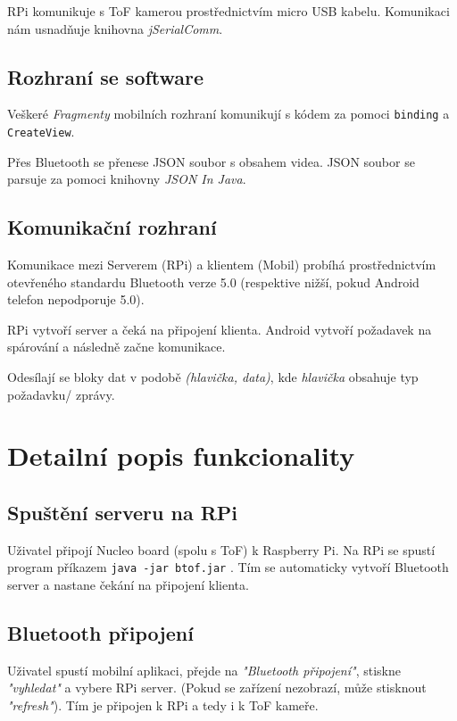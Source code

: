 \documentclass[12pt,a4paper]{article}
\begin{document}
RPi komunikuje s ToF kamerou prostřednictvím micro USB kabelu. Komunikaci nám usnadňuje knihovna \textit{jSerialComm}.

\subsection{Rozhraní se software}

Veškeré \textit{Fragmenty} mobilních rozhraní komunikují s kódem za pomoci \texttt{binding} a \texttt{CreateView}.

Přes Bluetooth se přenese JSON soubor s obsahem videa. JSON soubor se parsuje za pomoci knihovny \textit{JSON In Java}.


\subsection{Komunikační rozhraní}

Komunikace mezi Serverem (RPi) a klientem (Mobil) probíhá prostřednictvím otevřeného standardu Bluetooth verze 5.0 (respektive nižší, pokud Android telefon nepodporuje 5.0).

RPi vytvoří server a čeká na připojení klienta. Android vytvoří požadavek na spárování a následně začne komunikace.

Odesílají se bloky dat v podobě \textit{(hlavička, data)}, kde \textit{hlavička} obsahuje typ požadavku/ zprávy.

\section{Detailní popis funkcionality}

\subsection{Spuštění serveru na RPi}
Uživatel připojí Nucleo board (spolu s ToF) k Raspberry Pi.
Na RPi se spustí program příkazem \texttt{java -jar btof.jar} .
Tím se automaticky vytvoří Bluetooth server a nastane čekání na připojení klienta.

\subsection{Bluetooth připojení}
Uživatel spustí mobilní aplikaci, přejde na \textit{"Bluetooth připojení"}, stiskne \textit{"vyhledat"} a vybere RPi server. (Pokud se zařízení nezobrazí, může stisknout \textit{"refresh"}). Tím je připojen k RPi a tedy i k ToF kameře.
\end{document}
